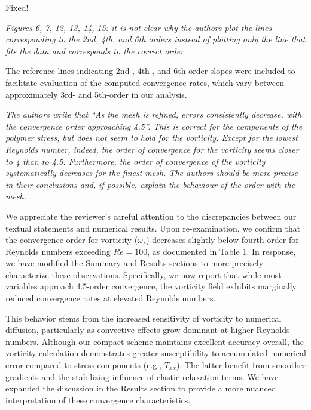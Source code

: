 \documentclass[12pt]{article}
\begin{document}
\vspace{3mm}
Fixed!
\vspace{3mm}

{\it Figures 6, 7, 12, 13, 14, 15: it is not clear why the authors plot the lines corresponding to the 2nd, 4th, and 6th orders instead of plotting only the line that fits the data and corresponds to the correct order.} 

\vspace{3mm}
The reference lines indicating 2nd-, 4th-, and 6th-order slopes were included to facilitate evaluation of the computed convergence rates, which vary between approximately 3rd- and 5th-order in our analysis. 
\vspace{3mm}

{\it The authors write that “As the mesh is refined, errors consistently decrease, with the convergence order approaching 4.5”. This is correct for the components of the polymer stress, but does not seem to hold for the vorticity. Except for the lowest Reynolds number, indeed, the order of convergence for the vorticity seems closer to 4 than to 4.5. Furthermore, the order of convergence of the vorticity systematically decreases for the finest mesh. The authors should be more precise in their conclusions and, if possible, explain the behaviour of the order with the mesh. .} 

\vspace{3mm}
We appreciate the reviewer's careful attention to the discrepancies between our textual statements and numerical results. Upon re-examination, we confirm that the convergence order for vorticity ($\omega_z$) decreases slightly below fourth-order for Reynolds numbers exceeding $Re = 100$, as documented in Table 1. In response, we have modified the Summary and Results sections to more precisely characterize these observations. Specifically, we now report that while most variables approach 4.5-order convergence, the vorticity field exhibits marginally reduced convergence rates at elevated Reynolds numbers.

This behavior stems from the increased sensitivity of vorticity to numerical diffusion, particularly as convective effects grow dominant at higher Reynolds numbers. Although our compact scheme maintains excellent accuracy overall, the vorticity calculation demonstrates greater susceptibility to accumulated numerical error compared to stress components (e.g., $T_{xx}$). The latter benefit from smoother gradients and the stabilizing influence of elastic relaxation terms. We have expanded the discussion in the Results section to provide a more nuanced interpretation of these convergence characteristics.
\vspace{3mm}
\end{document}
